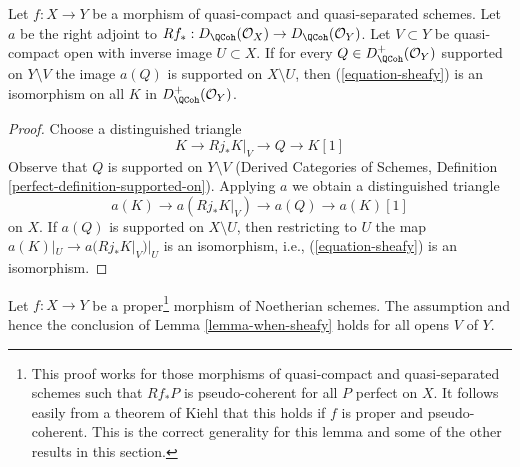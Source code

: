 \begin{lemma}
\label{lemma-when-sheafy}
Let $f : X \to Y$ be a morphism of quasi-compact and quasi-separated
schemes. Let $a$ be the right adjoint to
$Rf_* : D_\QCoh(\mathcal{O}_X) \to D_\QCoh(\mathcal{O}_Y)$.
Let $V \subset Y$ be quasi-compact open with inverse image $U \subset X$.
If for every $Q \in D_\QCoh^+(\mathcal{O}_Y)$ supported on $Y \setminus V$
the image $a(Q)$ is supported on $X \setminus U$, then (\ref{equation-sheafy})
is an isomorphism on all $K$ in $D_\QCoh^+(\mathcal{O}_Y)$.
\end{lemma}

\begin{proof}
Choose a distinguished triangle
$$
K \to Rj_*K|_V \to Q \to K[1]
$$
Observe that $Q$ is supported on $Y \setminus V$
(Derived Categories of Schemes, Definition
\ref{perfect-definition-supported-on}).
Applying $a$ we obtain a distinguished triangle
$$
a(K) \to a(Rj_*K|_V) \to a(Q) \to a(K)[1]
$$
on $X$. If $a(Q)$ is supported on $X \setminus U$, then
restricting to $U$ the map $a(K)|_U \to a(Rj_*K|_V)|_U$ is an
isomorphism, i.e., (\ref{equation-sheafy}) is an isomorphism.
\end{proof}

\begin{lemma}
\label{lemma-proper-noetherian}
Let $f : X \to Y$ be a proper\footnote{This proof works for those
morphisms of quasi-compact and quasi-separated schemes such that
$Rf_*P$ is pseudo-coherent for all $P$ perfect on $X$. It follows
easily from a theorem of Kiehl \cite{Kiehl} that this holds if
$f$ is proper and pseudo-coherent. This is the correct generality
for this lemma and some of the other results in this section.}
morphism of Noetherian schemes.
The assumption and hence the conclusion of
Lemma \ref{lemma-when-sheafy} holds for all opens $V$ of $Y$.
\end{lemma}


